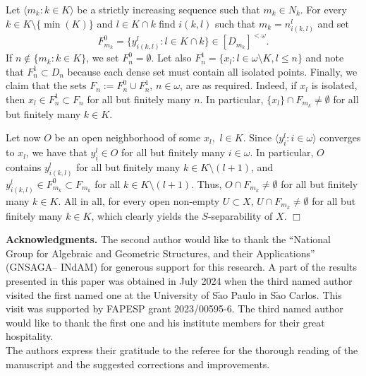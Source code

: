 \documentclass[12pt,a4paper]{amsart}
\theoremstyle{definition}
\newcommand{\w}{\omega}
\newcommand{\la}{\langle}
\newcommand{\ra}{\rangle}
\begin{document}
 Let $\la m_k:k\in K\ra$ be a strictly increasing sequence such that 
 $m_k\in N_k$.
 For every $k\in K\setminus\{\min(K)\}$ and $l\in K\cap k$ find 
 $i(k,l)$ such that $m_k=n^l_{i(k,l)}$
 and set 
 $$F^0_{m_k} = \{y^l_{i(k,l)}:l\in K\cap k\}\in [D_{m_k}]^{<\w}. $$
 If $n\not\in\{m_k:k\in K\}$, we set $F^0_n=\emptyset$. 
 Let also $F^1_n=\{x_l:l\in\w\setminus K,l\leq n\}$
 and note that $F^1_n\subset D_n $
 because each dense set must contain all isolated points.
 Finally, we claim that the sets $F_n:=F^0_n\cup F^1_n$, $n\in\w$,
 are as required. Indeed,
 if $x_l$ is  isolated, then
 $x_l\in F^1_n\subset F_n$ for all but finitely many
 $n$. In particular,  $\{x_l\}\cap F_{m_k}\neq\emptyset$
 for all but finitely many $k\in K$.

Let now $O$ be an open neighborhood of some $x_l,$ $l\in K$.
Since $\la y^l_i:i\in\w \ra$ converges to $x_l$,
we have that 
$y^l_i\in O$ for all but finitely many $i\in\w$. In particular,
$O$ contains $y^l_{i(k,l)}$ for all but finitely many 
$k\in K\setminus (l+1)$, and 
$y^l_{i(k,l)}\in F^0_{m_k}\subset F_{m_k}$ for all $k\in K\setminus(l+1)$.
Thus, $O\cap F_{m_k}\neq\emptyset$ for all but finitely many $k\in K$.
All in all, for every open non-empty
$U\subset X$, $U\cap F_{m_{k}}\neq\emptyset$ for all but finitely many
$k\in K$, which clearly yields the $S$-separability of $X$.
\hfill $\Box$
\medskip




 
\noindent \textbf{Acknowledgments.} The second author would like to thank the “National Group for Algebraic and Geometric Structures, and their Applications” (GNSAGA– INdAM) for generous support for this research. A part of the results presented in this paper was obtained in July 2024 when the third named author visited the first named one at the University of S$\tilde{\mathrm{a}}$o Paulo in S$\tilde{\mathrm{a}}$o Carlos. This visit was supported by FAPESP grant 2023/00595-6. The third named author would like to thank the first one and his institute members for their great hospitality.\\

The authors express their gratitude to the referee for the thorough reading of the manuscript and the suggested corrections and improvements.
\end{document}
